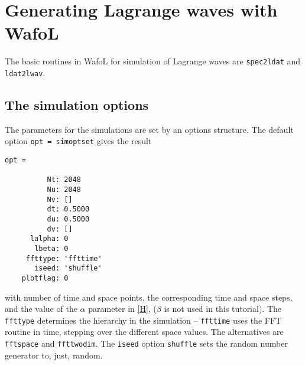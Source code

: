 \section{Generating Lagrange waves with {\sc Wafo}L}
The basic routines in {\sc Wafo}L for simulation of Lagrange waves are
{\tt spec2ldat} and {\tt ldat2lwav}.

\subsection{The simulation options}
The parameters for the simulations are set by an options structure.  The default option {\tt opt = simoptset} gives the result
{\small\begin{verbatim}
opt =

          Nt: 2048
          Nu: 2048
          Nv: []
          dt: 0.5000
          du: 0.5000
          dv: []
      lalpha: 0
       lbeta: 0
     ffttype: 'ffttime'
       iseed: 'shuffle'
    plotflag: 0
\end{verbatim}
}
\noindent
with number of time and space points,  the corresponding time and space steps, and the value of the $\alpha$ parameter in \eqref{H}, ($\beta$ is not used in this tutorial). The {\tt ffttype} determines the hierarchy in the simulation -- {\tt ffttime} uses the FFT routine in time, stepping over the different space values. The alternatives are {\tt fftspace} and {\tt ffttwodim}. The {\tt iseed} option {\tt shuffle} sets the random number generator to, just, random.

